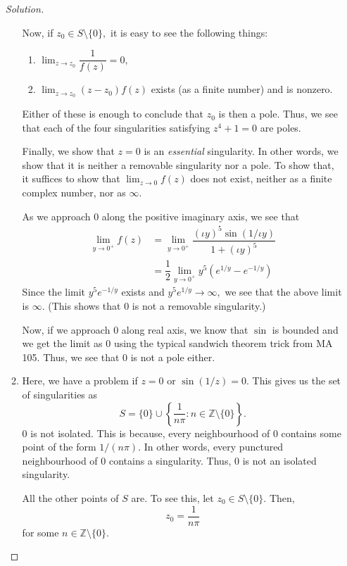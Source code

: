 \documentclass[12pt]{article}
\theoremstyle{definition}
\newenvironment{soln}{\begin{proof}[Solution]}{\end{proof}}
\begin{document}
\begin{enumerate}[leftmargin=*]
\begin{soln}
\begin{enumerate}
			Now, if $z_0 \in S\setminus\{0\},$ it is easy to see the following things:
			\begin{enumerate}
				\item $\displaystyle\lim_{z\to z_0}\dfrac{1}{f(z)} = 0,$
				\item $\displaystyle\lim_{z\to z_0}(z - z_0)f(z)$ exists (as a finite number) and is nonzero.
			\end{enumerate}
			Either of these is enough to conclude that $z_0$ is then a pole. Thus, we see that each of the four singularities satisfying $z^4 + 1 = 0$ are poles.

			Finally, we show that $z = 0$ is an \emph{essential} singularity. In other words, we show that it is neither a removable singularity nor a pole. To show that, it suffices to show that $\displaystyle\lim_{z\to 0}f(z)$ does not exist, neither as a finite complex number, nor as $\infty.$

			As we approach $0$ along the positive imaginary axis, we see that
			\begin{align*} 
				\lim_{y\to 0^+}f(z) &= \lim_{y\to 0^+}\dfrac{(\iota y)^5\sin(1/\iota y)}{1 + (\iota y)^5}\\
				&= \dfrac{1}{2}\lim_{y\to 0^+}y^5(e^{1/y} - e^{-1/y})
			\end{align*}
			Since the limit $y^5e^{-1/y}$ exists and $y^5e^{1/y}\to \infty,$ we see that the above limit is $\infty.$ (This shows that $0$ is not a removable singularity.)

			Now, if we approach $0$ along real axis, we know that $\sin$ is bounded and we get the limit as $0$ using the typical sandwich theorem trick from MA 105. Thus, we see that $0$ is not a pole either.
			\item Here, we have a problem if $z = 0$ or $\sin(1/z) = 0.$ This gives us the set of singularities as 
			\begin{equation*} 
				S = \{0\}\cup\left\{\dfrac{1}{n\pi} : n \in \mathbb{Z}\setminus\{0\}\right\}.
			\end{equation*}
			$0$ is not isolated. This is because, every neighbourhood of $0$ contains some point of the form $1/(n\pi).$ In other words, every punctured neighbourhood of $0$ contains a singularity. Thus, $0$ is not an isolated singularity.

			All the other points of $S$ are. To see this, let $z_0 \in S\setminus\{0\}.$ Then, 
			\begin{equation*} 
				z_0 = \dfrac{1}{n\pi}
			\end{equation*}
			for some $n \in \mathbb{Z}\setminus\{0\}.$


\end{enumerate}
\end{soln}
\end{enumerate}
\end{document}
